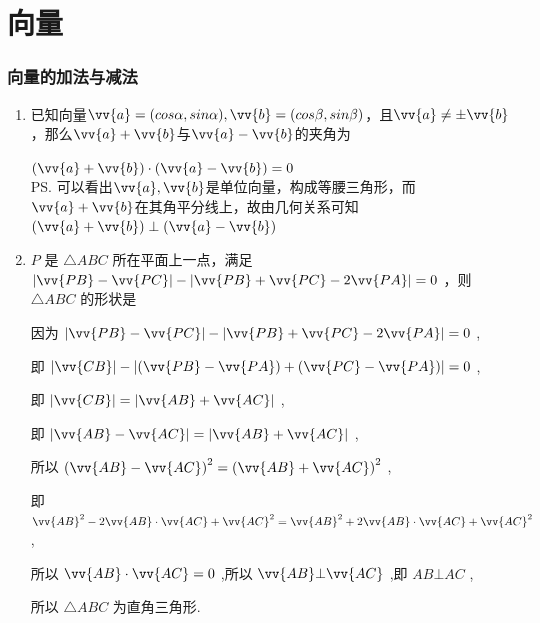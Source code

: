 \chapter*{向量}
\subsection*{向量的加法与减法}
\begin{enumerate}
    \item 已知向量$\vv{a} = (cos\alpha, sin\alpha), \vv{b} = (cos\beta, sin\beta)$，且$\vv{a} \neq \pm \vv{b}$，那么$\vv{a} + \vv{b}$与$\vv{a} - \vv{b}$的夹角为
    \begin{jieda}
        $(\vv{a} + \vv{b}) \cdot (\vv{a} - \vv{b}) = 0$ \\
        \ps 可以看出$\vv{a}, \vv{b}$是单位向量，构成等腰三角形，而$\vv{a} + \vv{b}$在其角平分线上，故由几何关系可知$(\vv{a} + \vv{b}) \perp (\vv{a} - \vv{b})$
    \end{jieda}
    \item $P$ 是 $\bigtriangleup  {ABC}$ 所在平面上一点，满足 $\left| {\vv{PB} - \vv{PC}}\right|  - \left| {\vv{PB} + \vv{PC} - 2\vv{PA}}\right|  = 0$ ，则 $\bigtriangleup  {ABC}$ 的形状是
    \begin{jieda}
        因为 $\left| {\vv{PB} - \vv{PC}}\right|  - \left| {\vv{PB} + \vv{PC} - 2\vv{PA}}\right|  = 0$ ,
        
        即 $\left| \vv{CB}\right|  - \left| {\left( {\vv{PB} - \vv{PA}}\right)  + \left( {\vv{PC} - \vv{PA}}\right) }\right|  = 0$ ,
        
        即 $\left| \vv{CB}\right|  = \left| {\vv{AB} + \vv{AC}}\right|$ ,
        
        即 $\left| {\vv{AB} - \vv{AC}}\right|  = \left| {\vv{AB} + \vv{AC}}\right|$ ,
        
        所以 ${\left( \vv{AB} - \vv{AC}\right) }^{2} = {\left( \vv{AB} + \vv{AC}\right) }^{2}$ ,
        
        即 ${\vv{AB}}^{2} - 2\vv{AB} \cdot  \vv{AC} + {\vv{AC}}^{2} = {\vv{AB}}^{2} + 2\vv{AB} \cdot  \vv{AC} + {\vv{AC}}^{2}$ ,
        
        所以 $\vv{AB} \cdot  \vv{AC} = 0$ ,所以 $\vv{AB} \bot  \vv{AC}$ ,即 ${AB} \bot  {AC}$ ,
        
        所以 $\bigtriangleup  {ABC}$ 为直角三角形.
    \end{jieda}
\end{enumerate}
